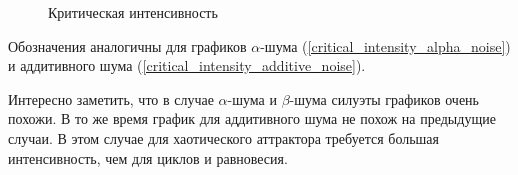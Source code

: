     \begin{figure}
        \centering
        
            
        \caption{Критическая интенсивность}
    \end{figure}
    
    Обозначения аналогичны для графиков \(\alpha\)-шума (\ref{critical_intensity_alpha_noise}) и аддитивного шума (\ref{critical_intensity_additive_noise}).

    Интересно заметить, что в случае \(\alpha\)-шума и \(\beta\)-шума силуэты графиков очень похожи. В то же время график для аддитивного шума не похож на предыдущие случаи. В этом случае для хаотического аттрактора требуется большая интенсивность, чем для циклов и равновесия. 
